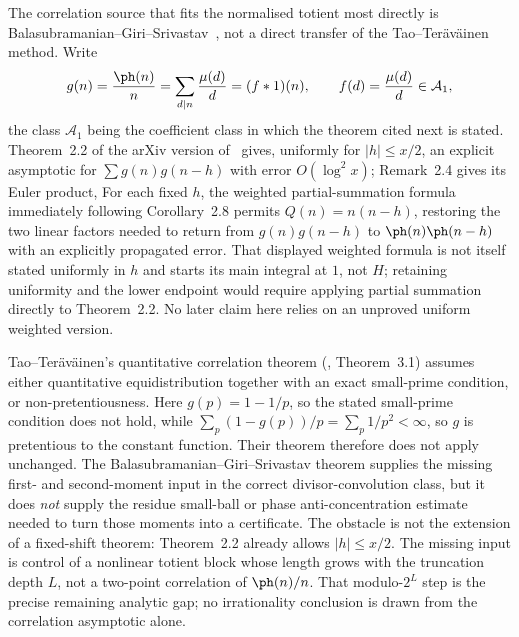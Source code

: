 \noindent The correlation source that fits the normalised totient most
directly is Balasubramanian--Giri--Srivastav~\cite{bgs2017}, not a direct
transfer of the Tao--Ter\"av\"ainen method.  Write
\[
  g(n)=\frac{\ph(n)}n
      =\sum_{d\mid n}\frac{\mu(d)}d=(f*1)(n),
  \qquad f(d)=\frac{\mu(d)}d\in\mathcal A_1 ,
\]
the class $\mathcal A_1$ being the coefficient class in which the theorem
cited next is stated.
Theorem~2.2 of the arXiv version of~\cite{bgs2017} gives, uniformly for
$|h|\le x/2$, an explicit asymptotic for
$\sum g(n)g(n-h)$ with error $O(\log^2x)$; Remark~2.4 gives its Euler product,
For each fixed $h$, the weighted partial-summation formula immediately
following Corollary~2.8 permits $Q(n)=n(n-h)$, restoring the two linear
factors needed to return from $g(n)g(n-h)$ to
$\ph(n)\ph(n-h)$ with an explicitly propagated error.  That displayed
weighted formula is not itself stated uniformly in $h$ and starts its main
integral at \(1\), not \(H\); retaining uniformity and the lower endpoint
would require applying partial summation directly to Theorem~2.2.  No later
claim here relies on an unproved uniform weighted version.

Tao--Ter\"av\"ainen's quantitative correlation theorem
(\cite{taoteravainen2025}, Theorem~3.1) assumes either quantitative
equidistribution together with an exact small-prime condition, or
non-pretentiousness.  Here $g(p)=1-1/p$, so the stated small-prime condition
does not hold, while
$\sum_p(1-g(p))/p=\sum_p1/p^2<\infty$, so $g$ is pretentious to the constant
function.  Their theorem therefore does not apply unchanged.  The
Balasubramanian--Giri--Srivastav theorem supplies the missing first- and
second-moment input in the correct divisor-convolution class, but it does
\emph{not} supply the residue small-ball or phase anti-concentration estimate
needed to turn those moments into a certificate.  The obstacle is not the
extension of a fixed-shift theorem: Theorem~2.2 already allows $|h|\le x/2$.
The missing input is control of a nonlinear totient block whose length grows
with the truncation depth $L$, not a two-point correlation of
$\ph(n)/n$.  That modulo-$2^L$ step is the precise remaining analytic gap;
no irrationality conclusion is drawn from the correlation asymptotic alone.



